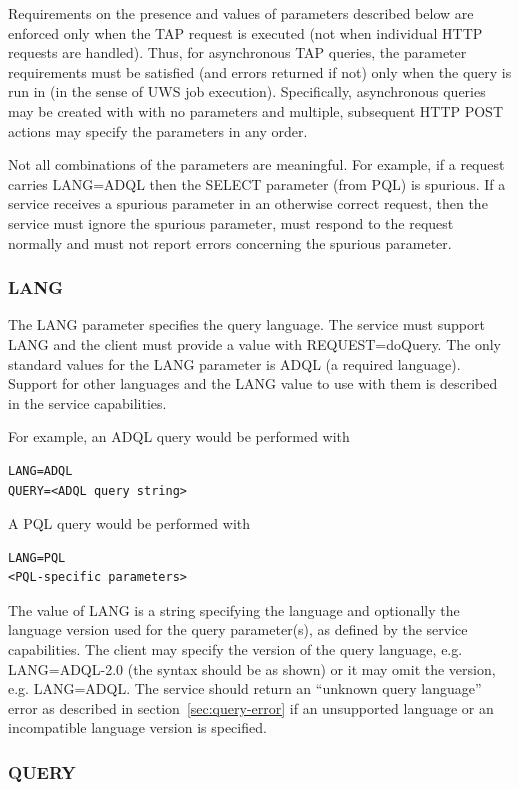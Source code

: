 \documentclass[11pt,letter]{ivoa}
\begin{document}
Requirements on the presence and values of parameters described below are 
enforced only when the TAP request is executed (not when individual HTTP 
requests are handled). Thus, for asynchronous TAP queries, the parameter 
requirements must be satisfied (and errors returned if not) only when the query 
is run in (in the sense of UWS job execution). Specifically, asynchronous 
queries may be created with with no parameters and multiple, subsequent HTTP 
POST actions may specify the parameters in any order.

Not all combinations of the parameters are meaningful. For example, if a request 
carries  LANG=ADQL then the SELECT parameter (from PQL) is spurious. If a 
service receives a spurious parameter in an otherwise correct request, then the 
service must ignore the spurious parameter, must respond to the request normally 
and must not report errors concerning the spurious parameter.

\subsubsection{LANG}
\label{sec:LANG}

The LANG parameter specifies the query language. The service must support LANG 
and the client must provide a value with REQUEST=doQuery. The only standard 
values for the LANG parameter is ADQL (a required language). Support for other 
languages and the LANG value to use with them is described in the service 
capabilities.

For example, an ADQL query would be performed with
\begin{verbatim}
LANG=ADQL
QUERY=<ADQL query string>
\end{verbatim}
A PQL query would be performed with
\begin{verbatim}
LANG=PQL
<PQL-specific parameters>
\end{verbatim}
The value of LANG is a string specifying the language and optionally the 
language version used for the query parameter(s), as defined by the service 
capabilities.  The client may specify the version of the query language,  e.g. 
LANG=ADQL-2.0 (the syntax should be as shown) or it may omit the version, e.g. 
LANG=ADQL.  The service should return an “unknown query language” error as 
described in section~\ref{sec:query-error} if an unsupported language or an incompatible 
language version is specified.

\subsubsection{QUERY}
\label{sec:QUERY}
\end{document}

